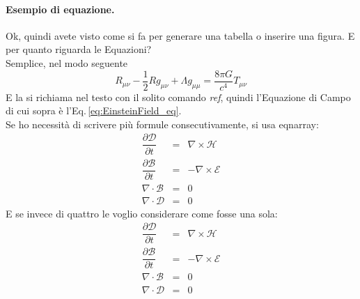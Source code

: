  
\paragraph{Esempio di equazione.} %
Ok, quindi avete visto come si fa per generare una tabella o inserire una figura. E per quanto riguarda le Equazioni?\\
Semplice, nel modo seguente
\begin{equation}\label{eq:EinsteinField_eq}
R_{\mu \nu} - \dfrac{1}{2} R g_{\mu \nu} + \Lambda g_{\mu \mu} = \dfrac{8 \pi G}{c^4} T_{\mu \nu}
\end{equation}
E la si richiama nel testo con il solito comando {\it ref}, quindi l'Equazione di Campo di cui sopra è l'Eq.\,\ref{eq:EinsteinField_eq}.\\
Se ho necessità di scrivere più formule consecutivamente, si usa eqnarray:
\begin{eqnarray}
\dfrac{\partial \mathcal D}{\partial t} &=& \nabla \times \mathcal H \\
\dfrac{\partial \mathcal B}{\partial t} &=& -\nabla \times \mathcal E \\
\nabla \cdot \mathcal B  &=& 0 \\
\nabla \cdot \mathcal D  &=& 0 
\end{eqnarray}
E se invece di quattro le voglio considerare come fosse una sola:
\begin{eqnarray}\label{eq:Maxwell_eq}
\dfrac{\partial \mathcal D}{\partial t} &=& \nabla \times \mathcal H \nonumber \\
\dfrac{\partial \mathcal B}{\partial t} &=& -\nabla \times \mathcal E \nonumber \\
\nabla \cdot \mathcal B  &=& 0 \nonumber \\
\nabla \cdot \mathcal D  &=& 0 
\end{eqnarray}

